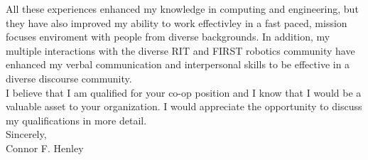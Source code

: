 \documentclass[line,margin]{res}
\begin{document}
\begin{resume}
\begin{adjustwidth}{-92pt}{0pt}
\noindent
All these experiences enhanced my knowledge in computing and engineering, but they have also improved my ability to work effectivley in a fast paced, mission focuses enviroment with people from diverse backgrounds. In addition, my multiple interactions with the diverse RIT and FIRST robotics community have enhanced my verbal communication and interpersonal skills to be effective in a diverse discourse community. \\

\noindent
I believe that I am qualified for your co-op position and I know that I would be a valuable asset to your organization. I would appreciate the opportunity to discuss my qualifications in more detail. \\

Sincerely, \\
Connor F. Henley

\end{adjustwidth}
\end{resume}
\end{document}
